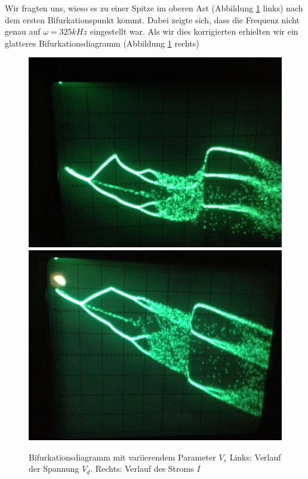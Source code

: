 \documentclass[12pt,a4paper]{article}
\begin{document}
Wir fragten uns, wieso es zu einer Spitze im oberen Ast (Abbildung \ref{fig:ldr-bifurc} links) nach dem ersten Bifurkationspunkt kommt. Dabei zeigte sich, dass die Frequenz nicht genau auf $\omega=325kHz$ eingestellt war. Als wir dies korrigierten erhielten wir ein glatteres Bifurkationsdiagramm (Abbildung \ref{fig:ldr-bifurc} rechts)

\begin{figure}[!htbp]
\centering
\includegraphics[scale=0.18]{bif-ldr/bifurc-bad}
\includegraphics[scale=0.18]{bif-ldr/bifurc-good}
\caption{Bifurkationsdiagramm mit variierendem Parameter $V_s$ Links: Verlauf der Spannung $V_d$. Rechts: Verlauf des Stroms $I$}
\label{fig:ldr-bifurc}
\end{figure}
\end{document}
